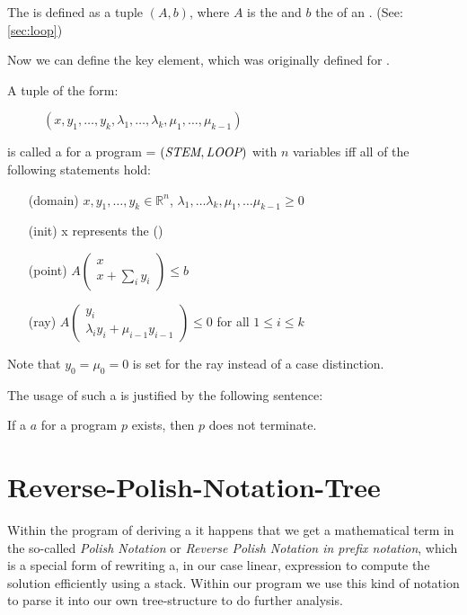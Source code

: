 \begin{definition}[LOOP]
	The \loopt is defined as a tuple $(A, b)$, where $A$ is the \iterationmatrix and $b$ the \iterationconstants of an \its. (See: \autoref{sec:loop})
\end{definition}

Now we can define the key element, which was originally defined for . 

\begin{definition}
	\label{def:gna}
	A tuple of the form:
	\begin{figure}[H]
		\centering
		$(x, y_1, \dots, y_k, \lambda_1, \dots, \lambda_k, \mu_1, \dots, \mu_{k-1})$
	\end{figure}  
	\vspace{-1em}
	is called a \gna for a program = $(\textit{STEM}, \textit{LOOP})$ with $n$ variables iff all of the following statements hold:
	\begin{itemize}
		\setlength{\itemindent}{1in}
		\item[(domain)] $x, y_1, \dots, y_k \in \mathbb{R}^n$, $\lambda_1, \dots \lambda_k, \mu_1, \dots \mu_{k-1} \ge 0$
		\item[(init)] x represents the \startterm (\stem)
		\item[(point)] $A\begin{pmatrix} x \\ x + \sum_i y_i \end{pmatrix} \le b$
		\item[(ray)] $A\begin{pmatrix} y_i \\ \lambda_i y_i + \mu_{i-1} y_{i-1} \end{pmatrix} \le 0$ for all $1 \le i \le k$
	\end{itemize}
	Note that $y_0 = \mu_0 = 0$ is set for the ray instead of a case distinction. \cite{leike2014geometric}
\end{definition}

The usage of such a \gna is justified by the following sentence:
\begin{satz}
	\label{sen:gna-nonterm}
	If a \gna $a$ for a program $p$ exists, then $p$ does not terminate. \cite{leike2014geometric} 
\end{satz}

\section{Reverse-Polish-Notation-Tree}
\label{sec:rpntree}
Within the program of deriving a \gna it happens that we get a mathematical term in the so-called \textit{Polish Notation} or \textit{Reverse Polish Notation in prefix notation}, which is a special form of rewriting a, in our case linear, expression to compute the solution efficiently using a stack. Within our program we use this kind of notation to parse it into our own tree-structure to do further analysis. \cite{wikirpn}

